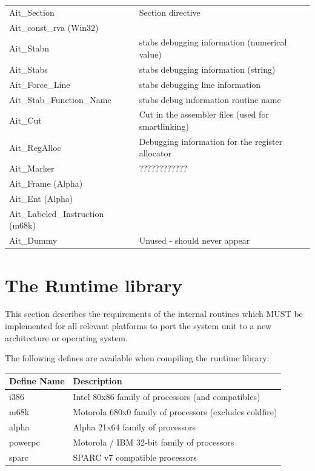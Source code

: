 \documentclass [a4paper,12pt]{article}
\begin{document}
\begin{longtable}{|l|p{10cm}|}
Ait{\_}Section&
    Section directive \\
Ait{\_}const{\_}rva (Win32)&  \\
Ait{\_}Stabn &
    stabs debugging information (numerical value) \\
Ait{\_}Stabs &
    stabs debugging information (string) \\
Ait{\_}Force{\_}Line&
    stabs debugging line information \\
Ait{\_}Stab{\_}Function{\_}Name&
    stabs debug information routine name \\
Ait{\_}Cut&
    Cut in the assembler files (used for smartlinking) \\
Ait{\_}RegAlloc&
    Debugging information for the register allocator \\
Ait{\_}Marker  & ???????????? \\
Ait{\_}Frame (Alpha)&  \\
Ait{\_}Ent (Alpha)&  \\
Ait{\_}Labeled{\_}Instruction (m68k)&  \\
Ait{\_}Dummy & Unused - should never appear
\end{longtable}

\section{The Runtime library}
\label{sec:mylabel9}

This section describes the requirements of the internal routines which MUST
be implemented for all relevant platforms to port the system unit to a new
architecture or operating system.

The following defines are available when compiling the runtime library:

\begin{longtable}{|l|p{10cm}|}
\hline
Define Name & Description \\
\hline
\endhead
\hline
\endfoot
i386        & Intel 80x86 family of processors (and compatibles) \\
m68k        & Motorola 680x0 family of processors (excludes coldfire) \\
alpha       & Alpha 21x64 family of processors \\
powerpc     & Motorola / IBM 32-bit family of processors \\
sparc       & SPARC v7 compatible processors
\end{longtable}
\end{document}
